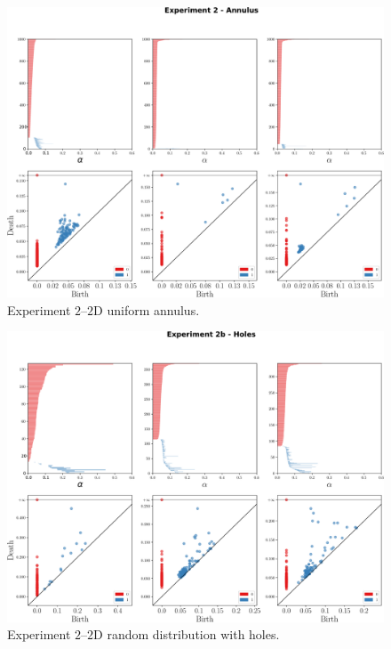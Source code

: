 \documentclass[10pt]{article}
\theoremstyle{definition}
\begin{document}
\begin{figure}[!htpb]
     \centering
     \includegraphics[width=\textwidth]{./figures/experiment-2-pd.pdf}
     \caption{Experiment $2$--$2$D uniform annulus.}%
     \label{Fig:persistence_exp2}
\end{figure}

\begin{figure}[!htpb]
     \centering
     \includegraphics[width=\textwidth]{./figures/experiment-2-bis-pd.pdf}
     \caption{Experiment $2$--$2$D random distribution with holes.}%
     \label{Fig:persistence_exp2b}
\end{figure}



\end{document}
